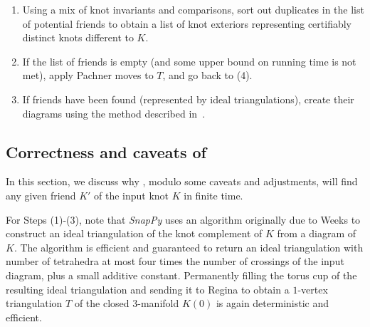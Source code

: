 \documentclass{amsart} %
\theoremstyle{thm}
\theoremstyle{definition}
\numberwithin{equation}{section}
\begin{document}
\begin{algorithm}
\begin{enumerate}
\begin{enumerate}
\begin{enumerate}
\begin{enumerate}
                    \item Create the filled manifold $E(s)$.
                    \item Check if $E(s)$ is diffeomorphic to $S^3$ (by either simplifying its fundamental group, or running $3$-sphere recognition in {\em Regina}).
                    \item If it is, add $E$ to the list of potential friends, skip to next edge $e$.
                \end{enumerate}
            \end{enumerate}
    \end{enumerate}
    \item Using a mix of knot invariants and comparisons, sort out duplicates in the list of potential friends to obtain a list of knot exteriors representing certifiably distinct knots different to $K$.
    \item If the list of friends is empty (and some upper bound on running time is not met), apply Pachner moves to $T$, and go back to (4).
    \item If friends have been found (represented by ideal triangulations), create their diagrams using the method described in~\cite{Dunfield_exterior_to_link}.
\end{enumerate}
\end{algorithm}

\subsection{Correctness and caveats of }

In this section, we discuss why , modulo some caveats and adjustments, will find any given friend $K'$ of the input knot $K$ in finite time.

For Steps (1)-(3), note that {\em SnapPy} uses an algorithm originally due to Weeks \cite{WeeksTriangulation} to construct an ideal triangulation of the knot complement of $K$ from a diagram of $K$. The algorithm is efficient and guaranteed to return an ideal triangulation with number of tetrahedra at most four times the number of crossings of the input diagram, plus a small additive constant. Permanently filling the torus cup of the resulting ideal triangulation and sending it to Regina to obtain a $1$-vertex triangulation $T$ of the closed $3$-manifold $K(0)$ is again deterministic and efficient.
\end{document}

